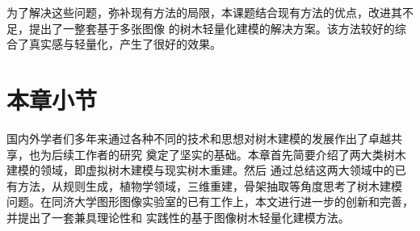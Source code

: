 为了解决这些问题，弥补现有方法的局限，本课题结合现有方法的优点，改进其不足，提出了一整套基于多张图像
的树木轻量化建模的解决方案。该方法较好的综合了真实感与轻量化，产生了很好的效果。

\section{本章小节}
国内外学者们多年来通过各种不同的技术和思想对树木建模的发展作出了卓越共享，也为后续工作者的研究
奠定了坚实的基础。本章首先简要介绍了两大类树木建模的领域，即虚拟树木建模与现实树木重建。然后
通过总结这两大领域中的已有方法，从规则生成，植物学领域，三维重建，骨架抽取等角度思考了树木建模
问题。在同济大学图形图像实验室的已有工作上，本文进行进一步的创新和完善，并提出了一套兼具理论性和
实践性的基于图像树木轻量化建模方法。
